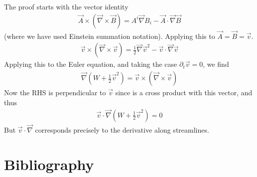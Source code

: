 \documentclass[letterpaper,10pt,english]{jupyterBook}
\begin{document}
\sphinxAtStartPar
The proof starts with the vector identity
\begin{equation*}
\begin{split}
	{\vec A} \times ({\vec \nabla}\times {\vec B}) = 
	A^i {\vec \nabla} B_i - {\vec A} \cdot {\vec \nabla} {\vec B}
\end{split}
\end{equation*}
\sphinxAtStartPar
(where we have used Einstein summation notation). Applying this to
\({\vec A} = {\vec B} = {\vec v}\).
\begin{equation*}
\begin{split}
	{\vec v} \times ({\vec \nabla} \times {\vec v}) = 
	\frac{1}{2} {\vec \nabla} {\vec v}^2 - {\vec v} \cdot{\vec \nabla}
	{\vec v}
\end{split}
\end{equation*}
\sphinxAtStartPar
Applying this to the Euler equation, and taking the case
\(\partial_t {\vec v} = 0\), we find
\begin{equation*}
\begin{split}
{\vec \nabla} (W + \frac{1}{2} {\vec v}^2) = {\vec v} \times({\vec \nabla}\times{\vec v})
\end{split}
\end{equation*}
\sphinxAtStartPar
Now the RHS is perpendicular to \({\vec v}\) since is a cross product with this
vector, and thus
\begin{equation*}
\begin{split}
	{\vec v} \cdot {\vec \nabla}  (W + \frac{1}{2} {\vec v}^2) = 0
\end{split}
\end{equation*}
\sphinxAtStartPar
But \({\vec v} \cdot {\vec \nabla}\) corresponds precisely to the derivative
along streamlines.


\chapter{Bibliography}
\label{\detokenize{bibliography:bibliography}}\label{\detokenize{bibliography::doc}}
\sphinxAtStartPar
\end{document}
